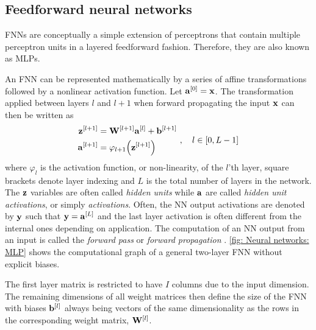 \subsection{Feedforward neural networks}
\Glspl{FNN} are conceptually a simple extension of perceptrons that contain multiple perceptron units in a layered feedforward fashion. Therefore, they are also known as \glspl{MLP}.

An \gls{FNN} can be represented mathematically by a series of affine transformations followed by a nonlinear activation function. Let ${\mathbf{a}}^{{\left[0\right]}}={\mathbf{x}}$. The transformation applied between layers $l$ and $l+1$ when forward propagating the input ${\mathbf{x}}$ can then be written as
\begin{equation}\label{eq: Neural networks: Feedforward neural network forward pass for l'th layer}
    \begin{aligned}
        {\mathbf{z}}^{{\left[l+1\right]}} &= {\mathbf{W}}^{{\left[l+1\right]}}{\mathbf{a}}^{{\left[l\right]}} + {\mathbf{b}}^{{\left[l+1\right]}}\\
        {\mathbf{a}}^{{\left[l+1\right]}} &= \varphi_{l+1}{\left({\mathbf{z}}^{{\left[l+1\right]}}\right)}
    \end{aligned}
     \ ,  \quad l\in[0,L-1]
\end{equation}
where $\varphi_l$ is the activation function, or non-linearity, of the $l$'th layer, square brackets denote layer indexing and $L$ is the total number of layers in the network. The ${\mathbf{z}}$ variables are often called \textit{hidden units} while ${\mathbf{a}}$ are called \textit{hidden unit activations}, or simply \textit{activations}. Often, the \gls{NN} output activations are denoted by ${\mathbf{y}}$ such that ${\mathbf{y}}={\mathbf{a}}^{{\left[L\right]}}$ and the last layer activation is often different from the internal ones depending on application. The computation of an \gls{NN} output from an input is called the \textit{forward pass} or \textit{forward propagation} \cite{Goodfellow2016}. \autoref{fig: Neural networks: MLP} shows the computational graph of a general two-layer \gls{FNN} without explicit biases. 

The first layer matrix is restricted to have $I$ columns due to the input dimension. The remaining dimensions of all weight matrices then define the size of the \gls{FNN} with biases ${\mathbf{b}}^{{\left[l\right]}}$ always being vectors of the same dimensionality as the rows in the corresponding weight matrix, ${\mathbf{W}}^{{\left[l\right]}}$.

